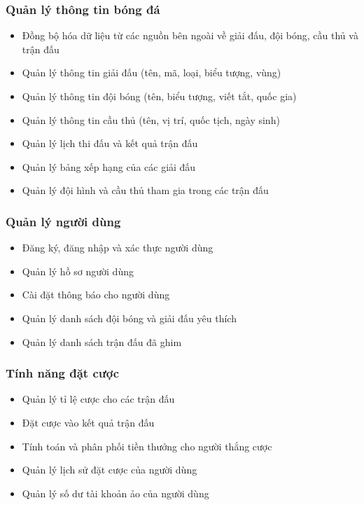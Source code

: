 \documentclass[a4paper,12pt]{report}
\begin{document}
\subsubsection{Quản lý thông tin bóng đá}
\begin{itemize}
    \item Đồng bộ hóa dữ liệu từ các nguồn bên ngoài về giải đấu, đội bóng, cầu thủ và trận đấu
    \item Quản lý thông tin giải đấu (tên, mã, loại, biểu tượng, vùng)
    \item Quản lý thông tin đội bóng (tên, biểu tượng, viết tắt, quốc gia)
    \item Quản lý thông tin cầu thủ (tên, vị trí, quốc tịch, ngày sinh)
    \item Quản lý lịch thi đấu và kết quả trận đấu
    \item Quản lý bảng xếp hạng của các giải đấu
    \item Quản lý đội hình và cầu thủ tham gia trong các trận đấu
\end{itemize}

\subsubsection{Quản lý người dùng}
\begin{itemize}
    \item Đăng ký, đăng nhập và xác thực người dùng
    \item Quản lý hồ sơ người dùng
    \item Cài đặt thông báo cho người dùng
    \item Quản lý danh sách đội bóng và giải đấu yêu thích
    \item Quản lý danh sách trận đấu đã ghim
\end{itemize}

\subsubsection{Tính năng đặt cược}
\begin{itemize}
    \item Quản lý tỉ lệ cược cho các trận đấu
    \item Đặt cược vào kết quả trận đấu
    \item Tính toán và phân phối tiền thưởng cho người thắng cược
    \item Quản lý lịch sử đặt cược của người dùng
    \item Quản lý số dư tài khoản ảo của người dùng
\end{itemize}
\end{document}
